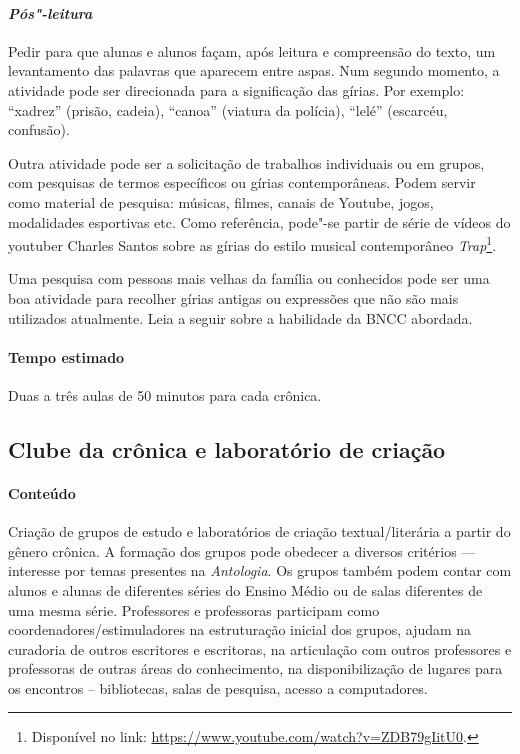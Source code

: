 \documentclass[11pt]{extarticle}
\begin{document}
\paragraph{\textit{Pós"-leitura}}

Pedir para que alunas e alunos façam, após leitura e compreensão do
texto, um levantamento das palavras que aparecem entre aspas. Num
segundo momento, a atividade pode ser direcionada para a significação
das gírias. Por exemplo: ``xadrez'' (prisão, cadeia), ``canoa'' (viatura
da polícia), ``lelé'' (escarcéu, confusão).

Outra atividade pode ser a solicitação de trabalhos individuais ou em
grupos, com pesquisas de termos específicos ou gírias contemporâneas.
Podem servir como material de pesquisa: músicas, filmes, canais de
Youtube, jogos, modalidades esportivas etc. Como referência, pode"-se
partir de série de vídeos do youtuber Charles Santos sobre as gírias do
estilo musical contemporâneo \emph{Trap}\footnote{Disponível no link:
  \url{https://www.youtube.com/watch?v=ZDB79gIitU0}.}.

Uma pesquisa com pessoas mais velhas da família ou conhecidos pode ser
uma boa atividade para recolher gírias antigas ou expressões que não são
mais utilizados atualmente.
Leia a seguir sobre a habilidade da BNCC abordada.

\paragraph{Tempo estimado} Duas a três aulas de 50 minutos para cada
crônica.


\subsection{Clube da crônica e laboratório de criação}


\paragraph{Conteúdo} Criação de grupos de estudo e laboratórios de criação
textual/literária a partir do gênero crônica. A formação dos grupos pode
obedecer a diversos critérios --- interesse por temas presentes na
\emph{Antologia}. Os grupos também podem
contar com alunos e alunas de diferentes séries do Ensino Médio ou de
salas diferentes de uma mesma série. Professores e professoras
participam como coordenadores/estimuladores na estruturação inicial dos
grupos, ajudam na curadoria de outros escritores e escritoras, na
articulação com outros professores e professoras de outras áreas do
conhecimento, na disponibilização de lugares para os encontros --
bibliotecas, salas de pesquisa, acesso a computadores.
\end{document}
